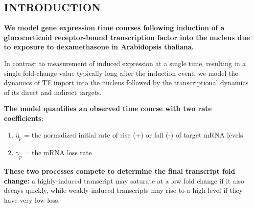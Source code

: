 \documentclass[aspb,landscape]{a0poster}
\begin{document}
\begin{multicols}{4} %

  \color{Black} %




  {
    \titlespacing{\section}{0pt}{0pt}{0pt} %
    \section*{INTRODUCTION}
  }

  \textbf{We model gene expression time courses following induction of a glucocorticoid receptor-bound transcription factor into the nucleus due to exposure to dexamethasone in Arabidopsis thaliana.}
  
  In contrast to measurement of induced expression at a single time, resulting in a single fold-change value typically long after the induction event,
  we model the dynamics of TF import into the nucleus followed by the transcriptional dynamics of its direct and indirect targets.
  
  \textbf{The model quantifies an observed time course with two rate coefficients}:
  \begin{enumerate}
  \item $\hat{\eta}_p$ = the normalized initial rate of rise (+) or fall (-) of target mRNA levels
  \item $\gamma_p$ = the mRNA loss rate
  \end{enumerate}
  \textbf{These two processes compete to determine the final transcript fold change:} a highly-induced transcript may saturate at a low fold change if it also decays quickly,
  while weakly-induced transcripts may rise to a high level if they have very low loss.
  

\end{multicols}
\end{document}

